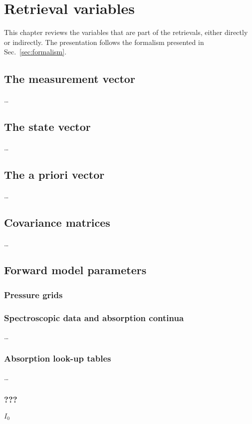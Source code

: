 \chapter{Retrieval variables}
\label{chapter:retvars}

This chapter reviews the variables that are part of the retrievals, either
directly or indirectly. The presentation follows the formalism presented in
Sec.~\ref{sec:formalism}.


\section{The measurement vector}
\label{sec:y}
%
\dots 


\section{The state vector}
\label{sec:x}
%
\dots


\section{The a priori vector}
\label{sec:x}
%
\dots


\section{Covariance matrices}
\label{sec:x}
%
\dots



\section{Forward model parameters}
\label{sec:b}


\subsection{Pressure grids}
\label{sec:b:pgrid}


\subsection{Spectroscopic data and absorption continua}
\label{sec:b:absdata}
%
\dots


\subsection{Absorption look-up tables}
\label{sec:b:abstable}
%
\dots






\subsection{???}
\label{sec:b:???}
%
$I_0$




